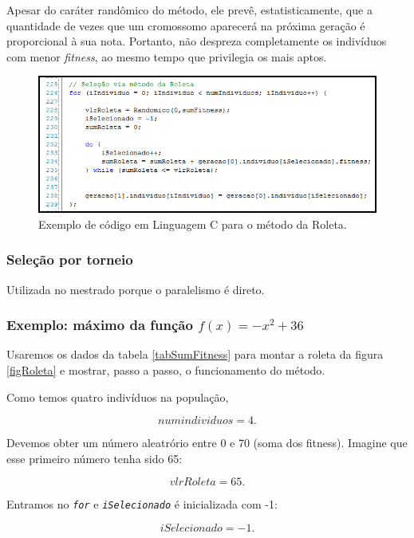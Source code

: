 	Apesar do caráter randômico do método, ele prevê, estatisticamente, que a quantidade de vezes que um cromossomo aparecerá na próxima geração é proporcional à sua nota. Portanto, não despreza completamente os indivíduos com menor \textit{fitness}, ao mesmo tempo que privilegia os mais aptos.

	\begin{figure}[htp]
		\begin{center}
			\includegraphics[width=13cm]{figs/ga/CodigoRoleta.png}
		\end{center}
		\caption{\label{figCodRoleta}Exemplo de código em Linguagem C para o método da Roleta.}
	\end{figure}
	
	\subsubsection{Seleção por torneio}
	
	Utilizada no mestrado porque o paralelismo é direto.
	
	\subsubsection{Exemplo: máximo da função $f(x) = -x^2 + 36$}
	
	Usaremos os dados da tabela \ref{tabSumFitness} para montar a roleta da figura \ref{figRoleta} e mostrar, passo a passo, o funcionamento do método.
	
	Como temos quatro indivíduos na população,
	
	$$
	numindividuos = 4.
	$$

	Devemos obter um número aleatrório entre 0 e 70 (soma dos fitness). Imagine que esse primeiro número tenha sido 65:
	
	$$
	vlrRoleta = 65.
	$$
	
	Entramos no \textit{\texttt{for}} e \textit{\texttt{iSelecionado}} é inicializada com -1:
	
	$$
	iSelecionado = -1.
	$$
	
